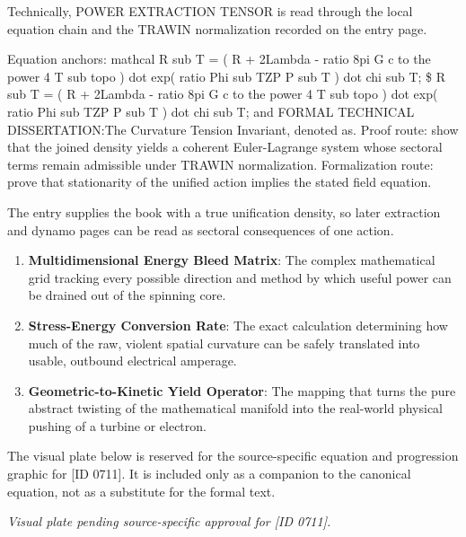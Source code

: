 Technically, POWER EXTRACTION TENSOR is read through the local equation chain and the TRAWIN normalization recorded on the entry page.

Equation anchors: mathcal R sub T = ( R + 2Lambda - ratio 8pi G c to the power 4 T sub topo ) dot exp( ratio Phi sub TZP P sub T ) dot chi sub T; \$ R sub T = ( R + 2Lambda - ratio 8pi G c to the power 4 T sub topo ) dot exp( ratio Phi sub TZP P sub T ) dot chi sub T; and FORMAL TECHNICAL DISSERTATION:The Curvature Tension Invariant, denoted as. Proof route: show that the joined density yields a coherent Euler-Lagrange system whose sectoral terms remain admissible under TRAWIN normalization. Formalization route: prove that stationarity of the unified action implies the stated field equation.

The entry supplies the book with a true unification density, so later extraction and dynamo pages can be read as sectoral consequences of one action.
\endgroup

\begin{enumerate}[leftmargin=1.6em,itemsep=6pt,topsep=4pt]
\item \textbf{Multidimensional Energy Bleed Matrix}: The complex mathematical grid tracking every possible direction and method by which useful power can be drained out of the spinning core.
\item \textbf{Stress-Energy Conversion Rate}: The exact calculation determining how much of the raw, violent spatial curvature can be safely translated into usable, outbound electrical amperage.
\item \textbf{Geometric-to-Kinetic Yield Operator}: The mapping that turns the pure abstract twisting of the mathematical manifold into the real-world physical pushing of a turbine or electron.
\end{enumerate}

\begingroup\footnotesize\sloppy
The visual plate below is reserved for the source-specific equation and progression graphic for [ID 0711]. It is included only as a companion to the canonical equation, not as a substitute for the formal text.
\par\endgroup
\begingroup\footnotesize\itshape
Visual plate pending source-specific approval for [ID 0711].
\par\endgroup

